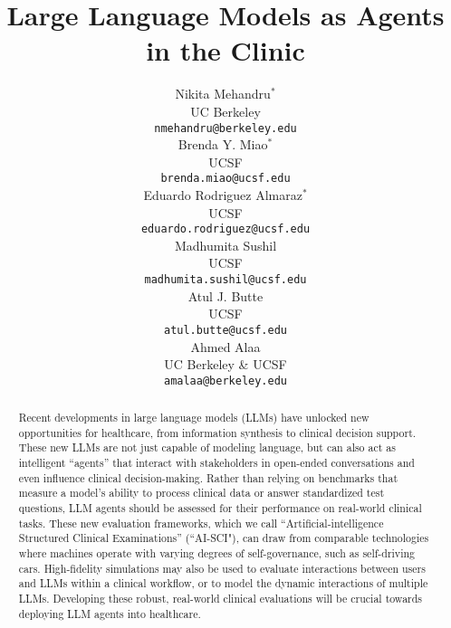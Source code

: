 \documentclass[10pt]{article}
\title{Large Language Models as Agents in the Clinic}
\author{
 Nikita Mehandru$^*$ \\
  UC Berkeley\\
  \texttt{nmehandru@berkeley.edu} \\
   \And
 Brenda Y. Miao$^*$ \\
  UCSF \\
  \texttt{brenda.miao@ucsf.edu} \\
\And
 Eduardo Rodriguez Almaraz$^*$ \\
  UCSF \\
  \texttt{eduardo.rodriguez@ucsf.edu} \\
\And
 Madhumita Sushil \\
  UCSF \\
  \texttt{madhumita.sushil@ucsf.edu} \\
\And
 Atul J. Butte \\
  UCSF \\
  \texttt{atul.butte@ucsf.edu} \\
\And
 Ahmed Alaa \\
  UC Berkeley \& UCSF \\
  \texttt{amalaa@berkeley.edu} \\
}
\begin{document}
\maketitle
\def\thefootnote{*}\def\thefootnote{\arabic{footnote}}

\begin{abstract}
Recent developments in large language models (LLMs) have unlocked new opportunities for healthcare, from information synthesis to clinical decision support. These new LLMs are not just capable of modeling language, but can also act as intelligent “agents” that interact with stakeholders in open-ended conversations and even influence clinical decision-making. Rather than relying on benchmarks that measure a model’s ability to process clinical data or answer standardized test questions, LLM agents should be assessed for their performance on real-world clinical tasks. These new evaluation frameworks, which we call “Artificial-intelligence Structured Clinical Examinations” (“AI-SCI"), can draw from comparable technologies where machines operate with varying degrees of self-governance, such as self-driving cars. High-fidelity simulations may also be used to evaluate interactions between users and LLMs within a clinical workflow, or to model the dynamic interactions of multiple LLMs. Developing these robust, real-world clinical evaluations will be crucial towards deploying LLM agents into healthcare.
\end{abstract}
\end{document}
